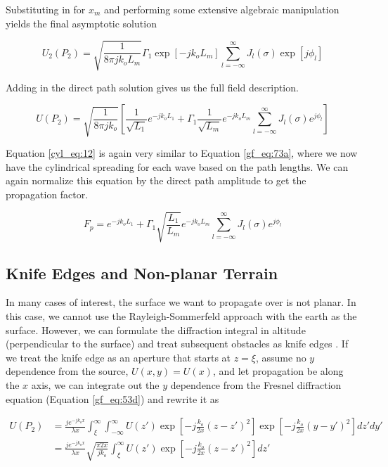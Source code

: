 \noindent Substituting in for $x_m$ and performing some extensive algebraic manipulation yields the final asymptotic solution

\begin{equation}
U_2(P_2) = \sqrt{\frac{1}{8\pi j k_oL_m}} \Gamma_1\exp[-jk_oL_m] \sum_{l=-\infty}^{\infty}J_l(\sigma)\exp\left[j\phi_l\right]
\label{cyl_eq:11}
\end{equation}
\renewcommand{\baselinestretch}{2} \small\normalsize

Adding in the direct path solution gives us the full field description.

\begin{equation}
\boxed{U(P_2) = \sqrt{\frac{1}{8\pi j k_o}}\left[\frac{1}{\sqrt{L_1}} e^{-jk_oL_1}+\Gamma_1\frac{1}{\sqrt{L_m}} e^{-jk_oL_m} \sum_{l=-\infty}^{\infty}J_l(\sigma)e^{j\phi_l}\right]}
\label{cyl_eq:12}
\end{equation}
\renewcommand{\baselinestretch}{2} \small\normalsize

Equation \ref{cyl_eq:12} is again very similar to Equation \ref{gf_eq:73a}, where we now have the cylindrical spreading for each wave based on the path lengths. We can again normalize this equation by the direct path amplitude to get the propagation factor.

\begin{equation}
F_p =e^{-jk_oL_1}+\Gamma_1\sqrt{\frac{L_1}{L_m}} e^{-jk_oL_m} \sum_{l=-\infty}^{\infty}J_l(\sigma)e^{j\phi_l}
\label{cyl_eq:13}
\end{equation}
\renewcommand{\baselinestretch}{2} \small\normalsize

\subsection {Knife Edges and Non-planar Terrain}
In many cases of interest, the surface we want to propagate over is not planar. In this case, we cannot use the Rayleigh-Sommerfeld approach with the earth as the surface. However, we can formulate the diffraction integral in altitude (perpendicular to the surface) and treat subsequent obstacles as knife edges \cite{whitteker_diffraction}. If we treat the knife edge as an aperture that starts at $z=\xi$, assume no $y$ dependence from the source, $U(x,y) = U(x)$, and let propagation be along the $x$ axis, we can integrate out the $y$ dependence from the Fresnel diffraction equation (Equation \ref{gf_eq:53d}) and rewrite it as 

\begin{equation}
\begin{aligned}
U(P_2) &=\frac{je^{-jk_ox}}{\lambda x}\int_{\xi}^{\infty}\int_{-\infty}^{\infty} U(z') \exp\left[-j \frac{k_o}{2x}\left(z-z'\right)^2 \right]   \exp\left[-j \frac{k_o}{2x}\left(y-y'\right)^2 \right]dz' dy' \\
&=\frac{je^{-jk_ox}}{\lambda x}\sqrt{\frac{\pi 2 x}{jk_o}}\int_{\xi}^{\infty}U(z') \exp\left[-j \frac{k_o}{2x}\left(z-z'\right)^2 \right]dz'\\
\end{aligned}
\label{gf_eq:82}
\end{equation}
\renewcommand{\baselinestretch}{2} \small\normalsize


